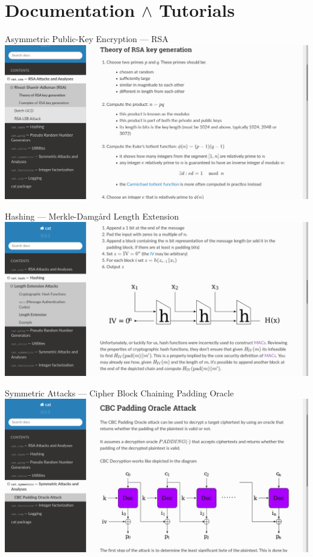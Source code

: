 \documentclass[10pt,aspectratio=169,table,usenames,dvipsnames,table]{beamer}
\begin{document}
\section{Documentation $\land$ Tutorials}

\begin{frame}{Asymmetric Public-Key Encryption --- RSA}
  \includegraphics[width=\textwidth, height=0.8\textheight, keepaspectratio]{rsa_doc.png}
\end{frame}

\begin{frame}{Hashing --- Merkle-Damgård Length Extension}
  \includegraphics[width=\textwidth, height=0.8\textheight, keepaspectratio]{md_doc.png}
\end{frame}

\begin{frame}{Symmetric Attacks --- Cipher Block Chaining Padding Oracle}
  \includegraphics[width=\textwidth, height=0.8\textheight, keepaspectratio]{cbc_doc.png}
\end{frame}
\end{document}
